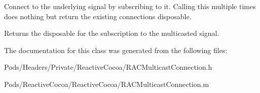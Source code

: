 Connect to the underlying signal by subscribing to it. Calling this multiple times does nothing but return the existing connection\textquotesingle{}s disposable.

Returns the disposable for the subscription to the multicasted signal. 

The documentation for this class was generated from the following files\+:\begin{DoxyCompactItemize}
\item 
Pods/\+Headers/\+Private/\+Reactive\+Cocoa/R\+A\+C\+Multicast\+Connection.\+h\item 
Pods/\+Reactive\+Cocoa/\+Reactive\+Cocoa/R\+A\+C\+Multicast\+Connection.\+m\end{DoxyCompactItemize}

